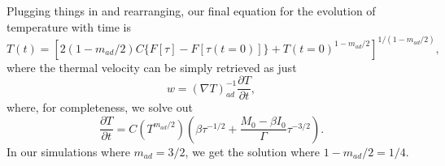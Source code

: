 \documentclass[onecolumn, amsmath, amsfonts, amssymb]{aastex62}
\newcommand{\grad}{\ensuremath{\nabla}}
\begin{document}
Plugging things in and rearranging, our final equation for the evolution of temperature with time
is
\begin{equation}
T(t) = \left[2(1 - m_{ad}/2)C\{F[\tau] - F[\tau(t=0)]\}
+ T(t=0)^{1-m_{ad}/2}\right]^{1/(1 - m_{ad}/2)},
\end{equation}
where the thermal velocity can be simply retrieved as just
\begin{equation}
w = (\grad T)_{ad}^{-1}\frac{\partial T}{\partial t},
\end{equation}
where, for completeness, we solve out
\begin{equation}
\frac{\partial T}{\partial t} 
= C ( T^{m_{ad}/2} ) \left(\beta\tau^{-1/2} + \frac{M_0 - \beta I_0}{\Gamma}\tau^{-3/2}\right).
\end{equation}
In our simulations where $m_{ad} = 3/2$, we get the solution where $1 - m_{ad}/2 = 1/4$.



\end{document}
